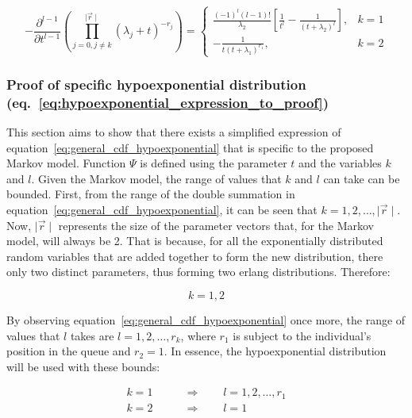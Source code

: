\begin{equation} \label{eq:hypoexponential_expression_to_proof}
    - \frac{\partial^{l - 1}}{\partial t ^{l - 1}}
    \left(
        \prod_{j = 0, j \neq k}^{\mid \vec{r} \mid} (\lambda_j + t)^{-r_j}
    \right) =
    \begin{cases}
        \frac{(-1)^{l} (l-1)!}{\lambda_2} \left[\frac{1}{t^l} - \frac{1}
        {(t + \lambda_2)^l}\right] , & k=1 \\
        - \frac{1}{t (t + \lambda_1)^{r_1}}, & k=2
    \end{cases}
\end{equation}



\subsubsection{Proof of specific hypoexponential distribution
(eq.~\eqref{eq:hypoexponential_expression_to_proof})}

This section aims to show that there exists a simplified expression of
equation~\eqref{eq:general_cdf_hypoexponential} that is specific to the proposed
Markov model.
Function \(\Psi\) is defined using the parameter \(t\) and the variables \(k\)
and \(l\).
Given the Markov model, the range of values that \(k\) and \(l\) can take can be
bounded.
First, from the range of the double summation in
equation~\eqref{eq:general_cdf_hypoexponential}, it can be seen that
\(k = 1, 2, \dots, \mid \vec{r} \mid\).
Now, \(\mid \vec{r} \mid\) represents the size of the parameter vectors that,
for the Markov model, will always be 2.
That is because, for all the exponentially distributed random variables that are
added together to form the new distribution, there only two distinct parameters,
thus forming two erlang distributions. Therefore:

\begin{equation*}
    k = 1, 2
\end{equation*}

By observing equation~\eqref{eq:general_cdf_hypoexponential} once more, the
range of values that \(l\) takes are \(l = 1, 2, \dots, r_k\), where \(r_1\) is
subject to the individual's position in the queue and \(r_2 = 1\).
In essence, the hypoexponential distribution will be used with these bounds:

\begin{align}
    k = 1 & \qquad \Rightarrow \qquad l = 1, 2, \dots, r_1 \nonumber \\
    k = 2 & \qquad \Rightarrow \qquad l = 1
\end{align}

